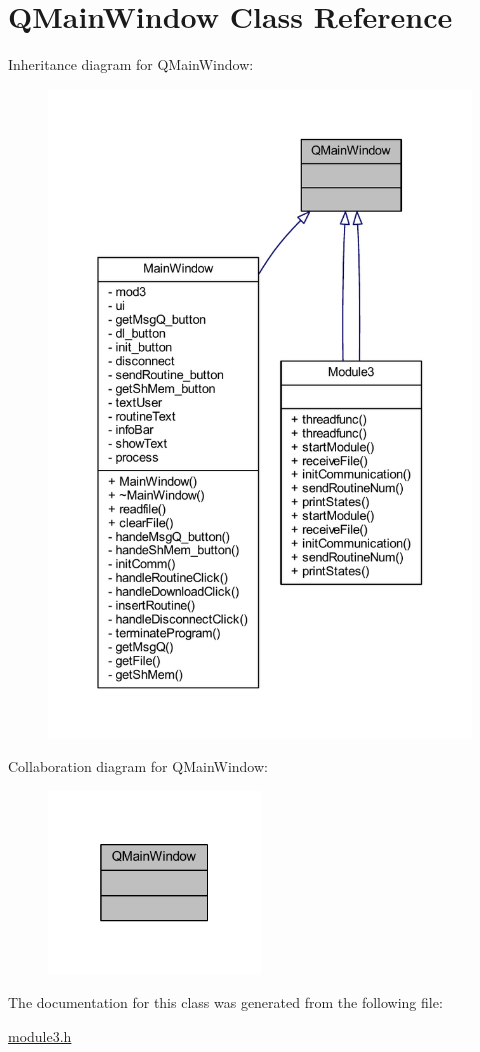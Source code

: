\hypertarget{class_q_main_window}{}\section{Q\+Main\+Window Class Reference}
\label{class_q_main_window}


Inheritance diagram for Q\+Main\+Window\+:
\nopagebreak
\begin{figure}[H]
\begin{center}
\leavevmode
\includegraphics[width=338pt]{class_q_main_window__inherit__graph}
\end{center}
\end{figure}


Collaboration diagram for Q\+Main\+Window\+:
\nopagebreak
\begin{figure}[H]
\begin{center}
\leavevmode
\includegraphics[width=160pt]{class_q_main_window__coll__graph}
\end{center}
\end{figure}


The documentation for this class was generated from the following file\+:\begin{DoxyCompactItemize}
\item 
\mbox{\hyperlink{module3_8h}{module3.\+h}}\end{DoxyCompactItemize}
